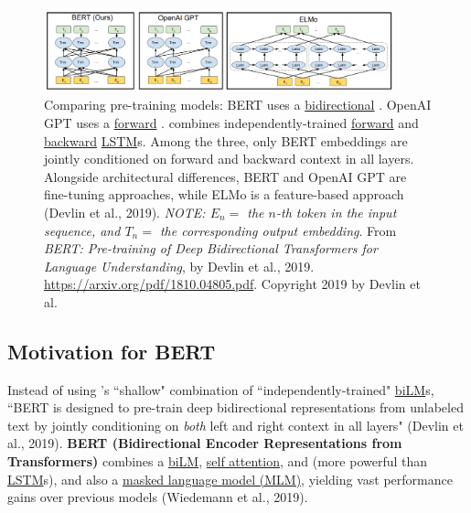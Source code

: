 \begin{figure}[h]
\vspace{-5pt}
\centering
\includegraphics[width=0.9\textwidth]{imgs/bert_vs_elmo_vs_gpt.png}
\vspace{-5pt}
\caption{\footnotesize Comparing pre-training models: BERT uses a \hyperref[sec:BidirectionalLM]{bidirectional} . OpenAI GPT uses a \hyperref[sec:ForwardLM]{forward} .  combines independently-trained \hyperref[sec:ForwardLM]{forward} and \hyperref[sec:BackwardLM]{backward} \hyperref[sec:LSTM]{LSTM}s. Among the three, only BERT embeddings are jointly conditioned on forward and backward context in all layers. Alongside architectural differences, BERT and OpenAI GPT are fine-tuning approaches, while ELMo is a feature-based approach (Devlin et al., 2019). \textit{NOTE: $E_n =$ the $n$-th token in the input sequence, and $T_n =$ the corresponding output embedding}. From \emph{BERT: Pre-training of Deep Bidirectional Transformers for Language Understanding}, by Devlin et al., 2019. \url{https://arxiv.org/pdf/1810.04805.pdf}. Copyright 2019 by Devlin et al.}
\vspace{-5pt}
\label{fig:NAME}
\end{figure}





\subsection{Motivation for BERT} \label{sec:MotivationForBERT}

Instead of using 's ``shallow" combination of ``independently-trained" \hyperref[sec:BidirectionalLM]{biLM}s, ``BERT is designed to pre-train deep bidirectional representations from unlabeled text by jointly conditioning on \emph{both} left and right context in all layers" (Devlin et al., 2019). \textbf{BERT (Bidirectional Encoder Representations from Transformers)} combines a \hyperref[sec:BidirectionalLM]{biLM}, \hyperref[sec:SelfAttention]{self attention}, and  (more powerful than \hyperref[sec:LSTM]{LSTM}s), and also a \hyperref[sec:maskedlanguagemodelMLM]{masked language model (MLM)}, yielding vast performance gains over previous models (Wiedemann et al., 2019).   


